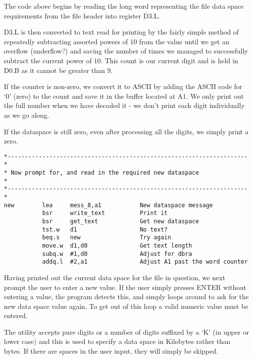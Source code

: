 The code above begins by reading the long word representing the file
    data space requirements from the file header into register D3.L.

D3.L is then converted to text read for printing by the fairly
    simple method of repeatedly subtracting assorted powers of 10 from the
    value until we get an overflow (underflow?) and saving the number of times
    we managed to successfully subtract the current power of 10. This count is
    our current digit and is held in D0.B as it cannot be greater than
    9.

If the counter is non-{}zero, we convert it to ASCII by adding the
    ASCII code for `0' (zero) to the count and save it in the buffer located
    at A1. We only print out the full number when we have decoded it -{} we
    don't print each digit individually as we go along.

If the dataspace is still zero, even after processing all the
    digits, we simply print a zero.

\begin{lstlisting}[firstnumber=last,caption={Dataspace Program - Part 7 - Get New Dataspace}]
*---------------------------------------------------------------------*
* Now prompt for, and read in the required new dataspace              *
*---------------------------------------------------------------------*
new        lea     mess_8,a1           New dataspace message
           bsr     write_text          Print it
           bsr     get_text            Get new dataspace
           tst.w   d1                  No text?
           beq.s   new                 Try again
           move.w  d1,d0               Get text length
           subq.w  #1,d0               Adjust for dbra
           addq.l  #2,a1               Adjust A1 past the word counter
\end{lstlisting}

Having printed out the current data space for the file in question,
    we next prompt the user to enter a new value. If the user simply presses
    ENTER without entering a value, the program detects this, and simply loops
    around to ask for the new data space value again. To get out of this loop
    a valid numeric value must be entered.

The utility accepts pure digits or a number of digits suffixed by a
    `K' (in upper or lower case) and this is used to specify a data space in
    Kilobytes rather than bytes. If there are spaces in the user input, they
    will simply be skipped.

